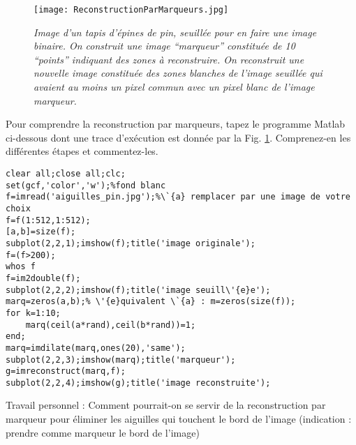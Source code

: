 \documentclass[10pt,a4paper]{article}
\begin{document}
\begin{figure}[H]
\begin{center}
\texttt{[image: ReconstructionParMarqueurs.jpg]}
\caption{\textit{Image d'un tapis d'\'{e}pines de pin, seuill\'{e}e pour en faire une image binaire. On construit une image ``marqueur'' constitu\'{e}e de 10 ``points'' indiquant des zones \`{a} reconstruire. On reconstruit une nouvelle image constitu\'{e}e des zones blanches de l'image seuill\'{e}e qui avaient au moins un pixel commun avec un pixel blanc de l'image marqueur.}}
\label{rpm}
\end{center}
\end{figure}%

\newpage

Pour comprendre la reconstruction par marqueurs, tapez le programme Matlab ci-dessous dont une trace d'ex\'{e}cution est donn\'{e}e par la Fig. \ref{rpm}. Comprenez-en les diff\'{e}rentes \'{e}tapes et commentez-les.

\begin{verbatim}
clear all;close all;clc;
set(gcf,'color','w');%fond blanc
f=imread('aiguilles_pin.jpg');%\`{a} remplacer par une image de votre choix
f=f(1:512,1:512);
[a,b]=size(f);
subplot(2,2,1);imshow(f);title('image originale');
f=(f>200);
whos f
f=im2double(f);
subplot(2,2,2);imshow(f);title('image seuill\'{e}e');
marq=zeros(a,b);% \'{e}quivalent \`{a} : m=zeros(size(f));
for k=1:10;
    marq(ceil(a*rand),ceil(b*rand))=1;
end;
marq=imdilate(marq,ones(20),'same');
subplot(2,2,3);imshow(marq);title('marqueur');
g=imreconstruct(marq,f);
subplot(2,2,4);imshow(g);title('image reconstruite');
\end{verbatim}

\bigskip

Travail personnel : Comment pourrait-on se servir de la reconstruction par marqueur pour \'{e}liminer les aiguilles qui touchent le bord de l'image (indication : prendre comme marqueur le bord de l'image)


%
\end{document}
